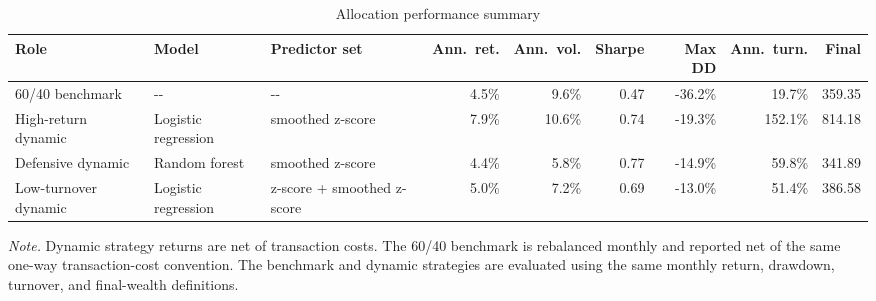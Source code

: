 \begin{table}[!htbp]
\centering
\caption{Allocation performance summary}
\label{tab:allocation-performance-summary}
\small
\setlength{\tabcolsep}{5pt}
\renewcommand{\arraystretch}{1.18}
\begin{adjustbox}{center,max width=\linewidth}
\begin{tabular}{lllrrrrrr}
\toprule
Role & Model & Predictor set & Ann.\ ret. & Ann.\ vol. & Sharpe & Max DD & Ann.\ turn. & Final \\
\midrule
60/40 benchmark & \mbox{-{}-} & \mbox{-{}-} & 4.5\% & 9.6\% & 0.47 & -36.2\% & 19.7\% & 359.35 \\
High-return dynamic & Logistic regression & smoothed z-score & 7.9\% & 10.6\% & 0.74 & -19.3\% & 152.1\% & 814.18 \\
Defensive dynamic & Random forest & smoothed z-score & 4.4\% & 5.8\% & 0.77 & -14.9\% & 59.8\% & 341.89 \\
Low-turnover dynamic & Logistic regression & z-score + smoothed z-score & 5.0\% & 7.2\% & 0.69 & -13.0\% & 51.4\% & 386.58 \\
\bottomrule
\end{tabular}
\end{adjustbox}
\vspace{0.65em}
\begin{minipage}{0.94\linewidth}
\footnotesize
\emph{Note.} Dynamic strategy returns are net of transaction costs. The 60/40 benchmark is rebalanced monthly and reported net of the same one-way transaction-cost convention. The benchmark and dynamic strategies are evaluated using the same monthly return, drawdown, turnover, and final-wealth definitions.
\end{minipage}
\end{table}
